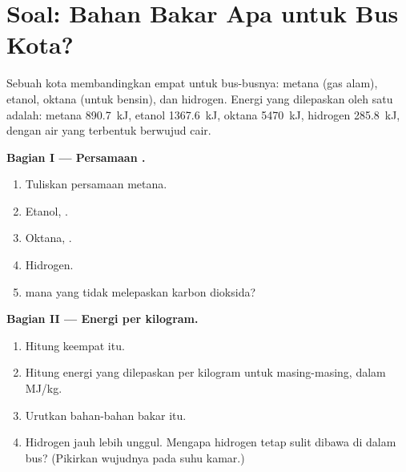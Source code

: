 \section{Soal: Bahan Bakar Apa untuk Bus Kota?}

\begin{problem}
\label{pb:g11:reaction-energy:1}
Sebuah kota membandingkan empat  untuk bus-busnya: metana (gas
alam), etanol, oktana (untuk bensin), dan hidrogen. Energi yang
dilepaskan oleh  satu  adalah: metana
\qty{890.7}{kJ}, etanol \qty{1367.6}{kJ}, oktana \qty{5470}{kJ},
hidrogen \qty{285.8}{kJ}, dengan air yang terbentuk berwujud cair.

\medskip
\noindent\textbf{Bagian I --- Persamaan .}
\begin{enumerate}
  \item Tuliskan persamaan  metana.
  \item Etanol, .
  \item Oktana, .
  \item Hidrogen.
  \item {} mana yang tidak melepaskan karbon dioksida?
\end{enumerate}

\medskip
\noindent\textbf{Bagian II --- Energi per kilogram.}
\begin{enumerate}[resume]
  \item Hitung  keempat  itu.
  \item Hitung energi yang dilepaskan per kilogram untuk masing-masing,
        dalam \si{MJ/kg}.
  \item Urutkan bahan-bahan bakar itu.
  \item Hidrogen jauh lebih unggul. Mengapa hidrogen tetap sulit dibawa
        di dalam bus? (Pikirkan wujudnya pada suhu kamar.)
\end{enumerate}


\end{problem}
